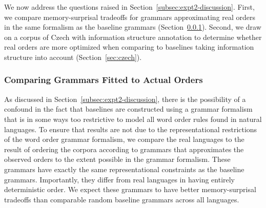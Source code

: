 










We now address the questions raised in Section~\ref{subsec:expt2-discussion}.
First, we compare memory-surprisal tradeoffs for grammars approximating real orders in the same formalism as the baseline grammars (Section~\ref{sec:compare-mle}).
Second, we draw on a corpus of Czech with information structure annotation to determine whether real orders are more optimized when comparing to baselines taking information structure into account (Section~\ref{sec:czech}).


\subsubsection{Comparing Grammars Fitted to Actual Orders}\label{sec:compare-mle}

As discussed in Section~\ref{subsec:expt2-discussion}, there is the possibility of a confound in the fact that baselines are constructed using a grammar formalism that is in some ways too restrictive to model all word order rules found in natural languages.
To ensure that results are not due to the representational restrictions of the word order grammar formalism, we compare the real languages to the result of ordering the corpora according to grammars that approximates the observed orders to the extent possible in the grammar formalism.
These grammars have exactly the same representational constraints as the baseline grammars.
Importantly, they differ from real languages in having entirely deterministic order.
We expect these grammars to have better memory-surprisal tradeoffs than comparable random baseline grammars across all languages.

